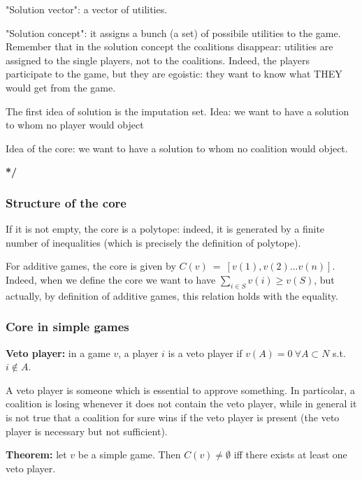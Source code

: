 \noindent "Solution vector": a vector of utilities. 

\noindent "Solution concept": it assigns 
a bunch (a set) of possibile utilities to the game. Remember that in the 
solution concept the coalitions disappear: utilities are assigned to the single 
players, not to the coalitions. Indeed, the players participate to the game, 
but they are egoistic: they want to know what THEY would get from the game.

\noindent The first idea of solution is the imputation set. Idea: we want to have a solution to whom no player would object


\noindent Idea of the core: we want to have a solution to whom no coalition would object.

\bigskip
\noindent \textbf{*/}

\subsubsection{Structure of the core}

\noindent If it is not empty, the core is a polytope: indeed, it is generated by 
a finite number of inequalities (which is precisely the definition of polytope).

\noindent For additive games, the core is given by $C(v)~=~[v(1),v(2)...v(n)]$. 
Indeed, when we define the core we want to have 
$\sum_{i \in S}{v(i)} \geq v(S)$, but actually, by definition of additive 
games, this relation holds with the equality.

\subsubsection{Core in simple games}

\noindent \textbf{Veto player:} in a game $v$, a player $i$ is a veto player if $v(A) = 0 ~\forall A \subset N$ s.t. $i \notin A$.

\bigskip
\noindent A veto player is someone which is essential to approve something. In 
particolar, a coalition is losing whenever it does not contain the veto player, 
while in general it is not true that a coalition for sure wins if the veto 
player is present (the veto player is necessary but not sufficient).

\bigskip
\noindent \textbf{Theorem:} let $v$ be a simple game. Then $C(v) \neq \emptyset$ iff there exists at least one veto player.

